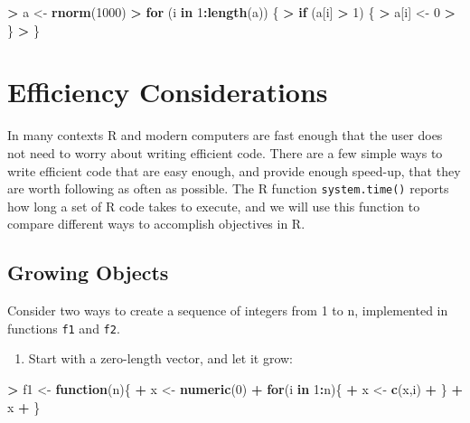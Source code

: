 \documentclass[]{krantz}
\makeatletter
\newenvironment{Shaded}{\begin{snugshade}}{\end{snugshade}}
\newcommand{\KeywordTok}[1]{\textcolor[rgb]{0.27,0.27,0.27}{\textbf{#1}}}
\newcommand{\DecValTok}[1]{\textcolor[rgb]{0.06,0.06,0.06}{#1}}
\newcommand{\StringTok}[1]{\textcolor[rgb]{0.5,0.5,0.5}{#1}}
\newcommand{\ControlFlowTok}[1]{\textcolor[rgb]{0.27,0.27,0.27}{\textbf{#1}}}
\newcommand{\OperatorTok}[1]{\textcolor[rgb]{0.43,0.43,0.43}{\textbf{#1}}}
\newcommand{\NormalTok}[1]{#1}
\providecommand{\tightlist}{%
  \setlength{\itemsep}{0pt}\setlength{\parskip}{0pt}}
\newenvironment{kframe}{%
\medskip{}
\setlength{\fboxsep}{.8em}
 \def\at@end@of@kframe{}%
 \ifinner\ifhmode%
  \def\at@end@of@kframe{\end{minipage}}%
  \begin{minipage}{\columnwidth}%
 \fi\fi%
 \def\FrameCommand##1{\hskip\@totalleftmargin \hskip-\fboxsep
 \colorbox{shadecolor}{##1}\hskip-\fboxsep
     \hskip-\linewidth \hskip-\@totalleftmargin \hskip\columnwidth}%
 \MakeFramed {\advance\hsize-\width
   \@totalleftmargin\z@ \linewidth\hsize
   \@setminipage}}%
 {\par\unskip\endMakeFramed%
 \at@end@of@kframe}
\renewenvironment{Shaded}{\begin{kframe}}{\end{kframe}}
\makeatother
\begin{document}
\begin{Shaded}
\begin{Highlighting}[]
\OperatorTok{>}\StringTok{ }\NormalTok{a <-}\StringTok{ }\KeywordTok{rnorm}\NormalTok{(}\DecValTok{1000}\NormalTok{)}
\OperatorTok{>}\StringTok{ }\ControlFlowTok{for}\NormalTok{ (i }\ControlFlowTok{in} \DecValTok{1}\OperatorTok{:}\KeywordTok{length}\NormalTok{(a)) \{}
\OperatorTok{>}\StringTok{   }\ControlFlowTok{if}\NormalTok{ (a[i] }\OperatorTok{>}\StringTok{ }\DecValTok{1}\NormalTok{) \{}
\OperatorTok{>}\StringTok{     }\NormalTok{a[i] <-}\StringTok{ }\DecValTok{0}
\OperatorTok{>}\StringTok{   }\NormalTok{\}}
\OperatorTok{>}\StringTok{ }\NormalTok{\}}
\end{Highlighting}
\end{Shaded}

\section{Efficiency Considerations}\label{efficiency-considerations}

In many contexts R and modern computers are fast enough that the user
does not need to worry about writing efficient code. There are a few
simple ways to write efficient code that are easy enough, and provide
enough speed-up, that they are worth following as often as possible. The
R function \texttt{system.time()} reports how long a set of R code takes
to execute, and we will use this function to compare different ways to
accomplish objectives in R.

\subsection{Growing Objects}\label{growing-objects}

Consider two ways to create a sequence of integers from 1 to n,
implemented in functions \texttt{f1} and \texttt{f2}.

\begin{enumerate}
\def\labelenumi{\arabic{enumi}.}
\tightlist
\item
  Start with a zero-length vector, and let it grow:
\end{enumerate}

\begin{Shaded}
\begin{Highlighting}[]
\OperatorTok{>}\StringTok{ }\NormalTok{f1 <-}\StringTok{ }\ControlFlowTok{function}\NormalTok{(n)\{}
\OperatorTok{+}\StringTok{     }\NormalTok{x <-}\StringTok{ }\KeywordTok{numeric}\NormalTok{(}\DecValTok{0}\NormalTok{)}
\OperatorTok{+}\StringTok{     }\ControlFlowTok{for}\NormalTok{(i }\ControlFlowTok{in} \DecValTok{1}\OperatorTok{:}\NormalTok{n)\{}
\OperatorTok{+}\StringTok{         }\NormalTok{x <-}\StringTok{ }\KeywordTok{c}\NormalTok{(x,i)}
\OperatorTok{+}\StringTok{     }\NormalTok{\}}
\OperatorTok{+}\StringTok{     }\NormalTok{x}
\OperatorTok{+}\StringTok{ }\NormalTok{\}}
\end{Highlighting}
\end{Shaded}
\end{document}
